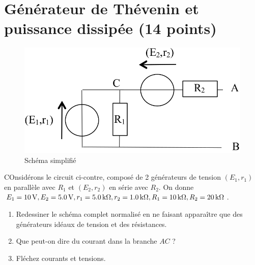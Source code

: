 \documentclass[10pt,a4paper]{article}
\begin{document}
\newpage

\section{Générateur de Thévenin et puissance dissipée (14 points)}
\begin{figure}
    \vspace*{-25pt}
    \raggedleft
    \includegraphics[width=\linewidth]{th_solo.png}
    \captionsetup{justification=centering}
    \caption{Schéma simplifié}
    \label{fig:solo}
\end{figure}
COnsidérons le circuit ci-contre, composé de 2 générateurs de tension 
$(E_1, r_1)$ en parallèle avec $R_1$ et $(E_2, r_2)$ en série avec $R_2$. On
donne $E_1 = \SI{10}{V}, E_2 = \SI{5.0}{V}, r_1= \SI{5.0}{k\Omega}, r_2 =
\SI{1.0}{k\Omega}, R_1 = \SI{10}{k\Omega}, R_2 = \SI{20}{k\Omega}$.

\begin{enumerate}[label=\color{brandeisblue}\arabic*)]
    \item Redessiner le schéma complet normalisé en ne faisant apparaître que
        des générateurs idéaux de tension et des résistances.
        \vspace{3cm}
    \item Que peut-on dire du courant dans la branche $AC$ ?
        \vspace{1cm}
    \item Fléchez courants et tensions.
\end{enumerate}
\end{document}
